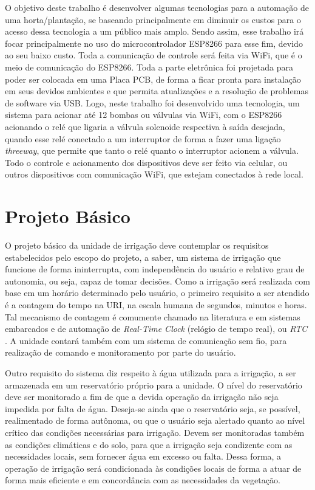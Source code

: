 \documentclass[conference]{IEEEtran}
\begin{document}
O objetivo deste trabalho é desenvolver algumas tecnologias para a automação de uma horta/plantação, se baseando principalmente em diminuir os custos para o acesso dessa tecnologia a um público mais amplo. Sendo assim, esse trabalho irá focar principalmente no uso do microcontrolador ESP8266 para esse fim, devido ao seu baixo custo. Toda a comunicação de controle será feita via WiFi, que é o meio de comunicação do ESP8266. Toda a parte eletrônica foi projetada para poder ser colocada em uma Placa PCB, de forma a ficar pronta para instalação em seus devidos ambientes e que permita atualizações e a resolução de problemas de software via USB. Logo, neste trabalho foi desenvolvido uma tecnologia, um sistema para acionar até 12 bombas ou válvulas via WiFi, com o ESP8266 acionando o relé que ligaria a válvula solenoide respectiva à saída desejada, quando esse relé conectado a um interruptor de forma a fazer uma ligação \textit{threeway}, que permite que tanto o relé quanto o interruptor acionem a válvula. Todo o controle e acionamento dos dispositivos deve ser feito via celular, ou outros dispositivos com comunicação WiFi, que estejam conectados à rede local.

\section{Projeto Básico}

O projeto básico da unidade de irrigação deve contemplar os requisitos estabelecidos pelo escopo do projeto, a saber, um sistema de irrigação que funcione de forma ininterrupta, com independência do usuário e relativo grau de autonomia, ou seja, capaz de tomar decisões. Como a irrigação será realizada com base em um horário determinado pelo usuário, o primeiro requisito a ser atendido é a contagem do tempo na URI, na escala humana de segundos, minutos e horas. Tal mecanismo de contagem é comumente chamado na literatura e em sistemas embarcados e de automação de \textit{Real-Time Clock} (relógio de tempo real), ou \textit{RTC} \cite{b1}. A unidade contará também com um sistema de comunicação sem fio, para realização de comando e monitoramento por parte do usuário.

Outro requisito do sistema diz respeito à água utilizada para a irrigação, a ser armazenada em um reservatório próprio para a unidade. O nível do reservatório deve ser monitorado a fim de que a devida operação da irrigação não seja impedida por falta de água. Deseja-se ainda que o reservatório seja, se possível, realimentado de forma autônoma, ou que o usuário seja alertado quanto ao nível crítico das condições necessárias para irrigação. Devem ser monitoradas também as condições climáticas e do solo, para que a irrigação seja condizente com as necessidades locais, sem fornecer água em excesso ou falta. Dessa forma, a operação de irrigação será condicionada às condições locais de forma a atuar de forma mais eficiente e em concordância com as necessidades da vegetação.
\end{document}
